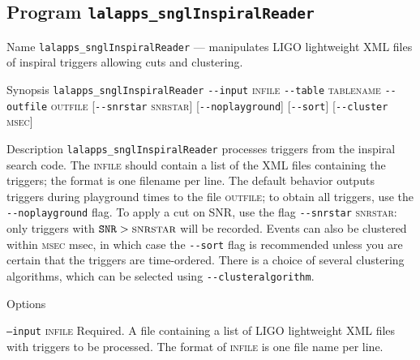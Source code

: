 %
% 
\clearpage
\subsection{Program \texttt{lalapps\_snglInspiralReader}}
\label{program:lalapps-snglInspiralReader}

\begin{entry}
\item[Name]
\verb$lalapps_snglInspiralReader$ --- manipulates LIGO lightweight XML
files of inspiral triggers allowing cuts and clustering.

\item[Synopsis]
\verb$lalapps_snglInspiralReader$ 
\verb$--input$ \textsc{infile} \verb$--table$ \textsc{tablename}
\newline 
\verb$--outfile$ \textsc{outfile}
[\verb$--snrstar$ \textsc{snrstar}] [\verb$--noplayground$] 
[\verb$--sort$] [\verb$--cluster$ \textsc{msec}] 

\item[Description] 
\verb$lalapps_snglInspiralReader$ processes triggers from the inspiral
search code.   The \textsc{infile} should contain a list of the XML
files containing the triggers;  the format is one filename per line. 
The default behavior outputs triggers during playground
times to the file \textsc{outfile};  to obtain all triggers,  use the 
\verb$--noplayground$ flag.    To apply a cut on SNR,  use the flag 
\verb$--snrstar$ \textsc{snrstar}:  only triggers with $\texttt{SNR} 
> \textsc{snrstar}$ will be recorded.    Events can also be clustered
within \textsc{msec} msec,   in which case the \verb$--sort$ flag is
recommended unless you are certain that the triggers are time-ordered.  
There is a choice of several clustering algorithms, which can be selected
using \verb$--clusteralgorithm$.


\item[Options]\leavevmode
\begin{entry}
\item[\texttt{--input} \textsc{infile}] Required.  A file containing a
list of LIGO lightweight XML files with triggers to be processed.  The
format of \textsc{infile} is one file name per line.


\end{entry}
\end{entry}
